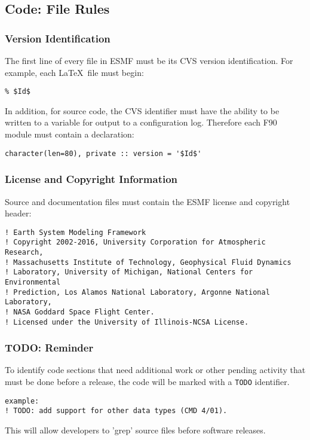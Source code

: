 \subsection{Code: File Rules} 

\subsubsection{Version Identification} 
The first line of every file in ESMF
  must be its CVS version identification. For example, each \LaTeX\ 
  file must begin:
\begin{verbatim}
% $Id$ 
\end{verbatim}

In addition, for source code, the CVS identifier must have the 
ability to be written to a variable for output to a configuration log.  
Therefore each F90 module must contain a declaration:
\begin{verbatim}
character(len=80), private :: version = '$Id$'
\end{verbatim}

\subsubsection{License and Copyright Information}

Source and documentation files must contain the ESMF license and 
copyright header:

\begin{verbatim}
! Earth System Modeling Framework
! Copyright 2002-2016, University Corporation for Atmospheric Research,
! Massachusetts Institute of Technology, Geophysical Fluid Dynamics
! Laboratory, University of Michigan, National Centers for Environmental
! Prediction, Los Alamos National Laboratory, Argonne National Laboratory,
! NASA Goddard Space Flight Center.
! Licensed under the University of Illinois-NCSA License.
\end{verbatim}

\subsubsection{TODO: Reminder} 
To identify code sections that need
additional work or other pending activity that must be done before a release,
the code will be marked with a {\tt TODO} identifier. 
\begin{verbatim}
example:
! TODO: add support for other data types (CMD 4/01).
\end{verbatim}
This will allow developers to 'grep' source files before software releases. 

